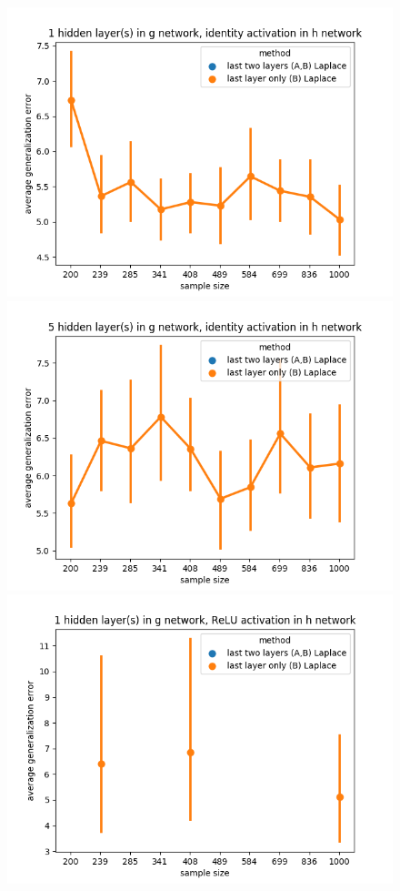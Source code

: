 \documentclass{article} %
\begin{document}
\begin{figure}[t!]
	\begin{center}
		\includegraphics[scale=0.35]{laplace_taskid12.png}
		\includegraphics[scale=0.35]{laplace_taskid13.png}
		\includegraphics[scale=0.35]{laplace_taskid14.png}

\end{center}
\end{figure}
\end{document}

